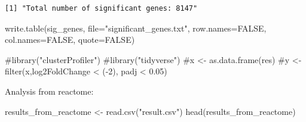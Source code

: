\documentclass[
  letterpaper,
  DIV=11,
  numbers=noendperiod]{scrartcl}
\newenvironment{Shaded}{\begin{snugshade}}{\end{snugshade}}
\newcommand{\AttributeTok}[1]{\textcolor[rgb]{0.40,0.45,0.13}{#1}}
\newcommand{\CommentTok}[1]{\textcolor[rgb]{0.37,0.37,0.37}{#1}}
\newcommand{\ConstantTok}[1]{\textcolor[rgb]{0.56,0.35,0.01}{#1}}
\newcommand{\FloatTok}[1]{\textcolor[rgb]{0.68,0.00,0.00}{#1}}
\newcommand{\FunctionTok}[1]{\textcolor[rgb]{0.28,0.35,0.67}{#1}}
\newcommand{\NormalTok}[1]{\textcolor[rgb]{0.00,0.23,0.31}{#1}}
\newcommand{\OtherTok}[1]{\textcolor[rgb]{0.00,0.23,0.31}{#1}}
\newcommand{\SpecialCharTok}[1]{\textcolor[rgb]{0.37,0.37,0.37}{#1}}
\newcommand{\StringTok}[1]{\textcolor[rgb]{0.13,0.47,0.30}{#1}}
\begin{document}
\begin{Shaded}
\end{Shaded}

\begin{verbatim}
[1] "Total number of significant genes: 8147"
\end{verbatim}

\begin{Shaded}
\begin{Highlighting}[]
\FunctionTok{write.table}\NormalTok{(sig\_genes, }\AttributeTok{file=}\StringTok{"significant\_genes.txt"}\NormalTok{, }\AttributeTok{row.names=}\ConstantTok{FALSE}\NormalTok{, }\AttributeTok{col.names=}\ConstantTok{FALSE}\NormalTok{, }\AttributeTok{quote=}\ConstantTok{FALSE}\NormalTok{)}
\end{Highlighting}
\end{Shaded}

\begin{Shaded}
\begin{Highlighting}[]
\CommentTok{\#library("clusterProfiler")}
\CommentTok{\#library("tidyverse")}
\CommentTok{\#x \textless{}{-} as.data.frame(res)}
\CommentTok{\#y \textless{}{-} filter(x,log2FoldChange \textless{} ({-}2), padj \textless{} 0.05)}
\end{Highlighting}
\end{Shaded}

Analysis from reactome:

\begin{Shaded}
\begin{Highlighting}[]
\NormalTok{results\_from\_reactome }\OtherTok{\textless{}{-}} \FunctionTok{read.csv}\NormalTok{(}\StringTok{"result.csv"}\NormalTok{)}
\FunctionTok{head}\NormalTok{(results\_from\_reactome)}
\end{Highlighting}
\end{Shaded}
\end{document}
